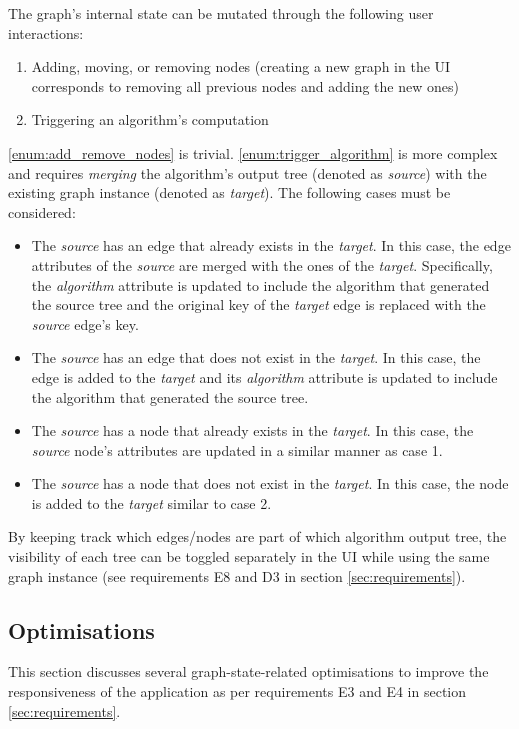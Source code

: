 \documentclass{l4proj}
\begin{document}
The graph's internal state can be mutated through the following user interactions:
\begin{enumerate}
    \item \label{enum:add_remove_nodes} Adding, moving, or removing nodes (creating a new graph in the UI corresponds to removing all previous nodes and adding the new ones)
    \item \label{enum:trigger_algorithm} Triggering an algorithm's computation
\end{enumerate}
\ref{enum:add_remove_nodes} is trivial.
\ref{enum:trigger_algorithm} is more complex and requires \textit{merging} the algorithm's output tree (denoted as \textit{source}) with the existing graph instance (denoted as \textit{target}). The following cases must be considered:
\begin{itemize}
    \item The \textit{source} has an edge that already exists in the \textit{target}. In this case, the edge attributes of the \textit{source} are merged with the ones of the \textit{target}. Specifically, the \textit{algorithm} attribute is updated to include the algorithm that generated the source tree and the original key of the \textit{target} edge is replaced with the \textit{source} edge's key.
    \item The \textit{source} has an edge that does not exist in the \textit{target}. In this case, the edge is added to the \textit{target} and its \textit{algorithm} attribute is updated to include the algorithm that generated the source tree.
    \item The \textit{source} has a node that already exists in the \textit{target}. In this case, the \textit{source} node's attributes are updated in a similar manner as case 1.
    \item The \textit{source} has a node that does not exist in the \textit{target}. In this case, the node is added to the \textit{target} similar to case 2.
\end{itemize}

By keeping track which edges/nodes are part of which algorithm output tree, the visibility of each tree can be toggled separately in the UI while using the same graph instance (see requirements E8 and D3 in section \ref{sec:requirements}).

\subsection{Optimisations}
This section discusses several graph-state-related optimisations to improve the responsiveness of the application as per requirements E3 and E4 in section \ref{sec:requirements}.
\end{document}
